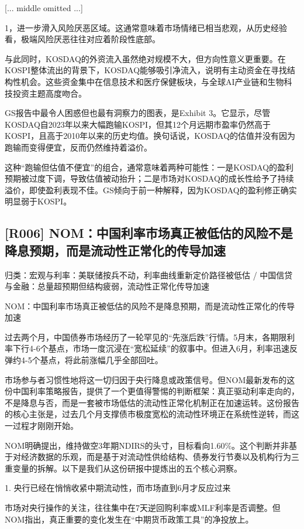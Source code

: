 \documentclass[11pt]{ctexart}
\begin{document}
[... middle omitted ...]

1，进一步滑入风险厌恶区域。这通常意味着市场情绪已相当悲观，从历史经验看，极端风险厌恶往往对应着阶段性底部。

与此同时，KOSDAQ的外资流入虽然绝对规模不大，但方向性意义更重要。在KOSPI整体流出的背景下，KOSDAQ能够吸引净流入，说明有主动资金在寻找结构性机会。这些资金集中在信息技术和医疗保健板块，与全球AI产业链和生物科技投资主题高度吻合。

GS报告中最令人困惑但也最有洞察力的图表，是Exhibit 3。它显示，尽管KOSDAQ自2023年以来大幅跑输KOSPI，但其12个月远期市盈率仍然高于KOSPI，且高于2010年以来的历史均值。换句话说，KOSDAQ的估值并没有因为跑输而变得便宜，反而仍然维持着溢价。

这种“跑输但估值不便宜”的组合，通常意味着两种可能性：一是KOSDAQ的盈利预期被过度下调，导致估值被动抬升；二是市场对KOSDAQ的成长性给予了持续溢价，即使盈利表现不佳。GS倾向于前一种解释，因为KOSDAQ的盈利修正确实明显弱于KOSPI。

\subsection{[R006] NOM：中国利率市场真正被低估的风险不是降息预期，而是流动性正常化的传导加速}
{\small\color{refgray}归类：宏观与利率：美联储按兵不动，利率曲线重新定价路径被低估 / 中国信贷与金融：总量超预期但结构疲弱，流动性正常化传导加速}

NOM：中国利率市场真正被低估的风险不是降息预期，而是流动性正常化的传导加速

过去两个月，中国债券市场经历了一轮罕见的“先涨后跌”行情。5月末，各期限利率下行4-6个基点，市场一度沉浸在“宽松延续”的叙事中。但进入6月，利率迅速反弹约4-5个基点，将此前涨幅几乎全部回吐。

市场参与者习惯性地将这一切归因于央行降息或政策信号。但NOM最新发布的这份中国利率策略报告，提供了一个更值得警惕的判断框架：真正驱动利率走向的，不是降息与否，而是一套被市场低估的流动性正常化机制正在加速运转。这份报告的核心主张是，过去几个月支撑债市极度宽松的流动性环境正在系统性逆转，而这一过程才刚刚开始。

NOM明确提出，维持做空3年期NDIRS的头寸，目标看向1.60\%。这个判断并非基于对经济数据的乐观，而是基于对流动性供给结构、债券发行节奏以及机构行为三重变量的拆解。以下是我们从这份研报中提炼出的五个核心洞察。

1. 央行已经在悄悄收紧中期流动性，而市场直到6月才反应过来

市场对央行操作的关注，往往集中在7天逆回购利率或MLF利率是否调整。但NOM指出，真正重要的变化发生在“中期货币政策工具”的净投放上。
\end{document}
